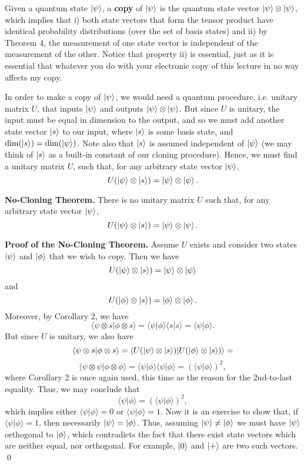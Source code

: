 \documentclass [12pt]{article}
\theoremstyle{definition}
\begin{document}
Given a quantum state $\ket{\psi}$, a \textbf{copy} of $\ket{\psi}$ is the quantum state vector $\ket{\psi}\otimes \ket{\psi}$, which implies that i) both state vectors that form
the tensor product have identical probability distributions (over the set of basis states) and ii) by Theorem 4, the measurement of one state vector is independent of the measurement
of the other. Notice that property ii) is essential, just as it is essential that whatever you do with your electronic copy of this lecture in no way affects my copy.

In order to make a copy of $\ket{\psi}$, we would need a quantum procedure, i.e. unitary matrix $U$, that inputs $\ket{\psi}$ and outputs $\ket{\psi}\otimes \ket{\psi}$.
But since $U$ is unitary, the input must be equal in dimension to the output, and so we must add another state vector $\ket{s}$ to our input, where $\ket{s}$ is some basis state,
and $\mbox{dim}(\ket{s})=\mbox{dim}(\ket{\psi})$. Note also that $\ket{s}$ is assumed independent of $\ket{\psi}$ (we may think of $\ket{s}$ as a built-in constant of our cloning
procedure). Hence, we must find a unitary matrix $U$, such that, for any arbitrary state vector $\ket{\psi}$, 
\[U(\ket{\psi}\otimes \ket{s}) = \ket{\psi}\otimes \ket{\psi}.\]

\textbf{No-Cloning Theorem.} There is no unitary matrix $U$ such that, for any arbitrary state vector $\ket{\psi}$, 
\[U(\ket{\psi}\otimes \ket{s}) = \ket{\psi}\otimes \ket{\psi}.\]

\newpage
\textbf{Proof of the No-Cloning Theorem.} Assume $U$ exists and consider two states $\ket{\psi}$ and $\ket{\phi}$ that we wish to copy.
Then we have 
\[U(\ket{\psi}\otimes \ket{s}) = \ket{\psi}\otimes \ket{\psi}\]
and
\[U(\ket{\phi}\otimes \ket{s}) = \ket{\phi}\otimes \ket{\phi}.\]
Moreover, by Corollary 2, we have
\[\langle \psi\otimes s | \phi\otimes s\rangle = \langle \psi | \phi\rangle \langle s|s\rangle = 
\langle \psi | \phi\rangle.\]
But since $U$ is unitary, we also have
\[\langle \psi\otimes s | \phi\otimes s\rangle = \langle U(\ket{\psi}\otimes \ket{s}) | U(\ket{\phi}\otimes \ket{s})\rangle = \]
\[ \langle \psi\otimes \psi | \phi\otimes \phi\rangle = \langle \psi | \phi\rangle\langle \psi | \phi\rangle =
(\langle \psi | \phi\rangle)^2,\]
where Corollary 2 is once again used, this time as the reason for the 2nd-to-last equality.
Thus, we may conclude that 
\[\langle \psi | \phi\rangle = (\langle \psi | \phi\rangle)^2,\]
which implies either $\langle \psi | \phi\rangle = 0$ or $\langle \psi | \phi\rangle = 1$. Now it is an exercise to show that, if 
$\langle \psi | \phi\rangle = 1$, then necessarily $\ket{\psi}=\ket{\phi}$. Thus, assuming $\ket{\psi}\not=\ket{\phi}$ we must have 
$\ket{\psi}$ orthogonal to $\ket{\phi}$, which contradicts the fact that there exist state vectors which are neither equal, nor orthogonal. For example,
$\ket{0}$ and $\ket{+}$ are two such vectors. \qed
\end{document}

